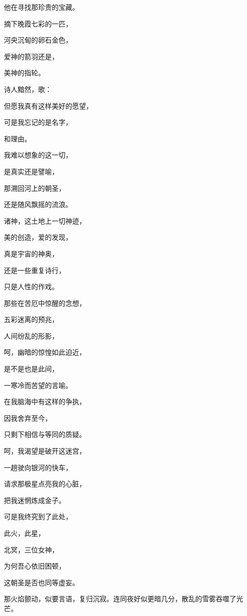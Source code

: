 \documentclass[UTF8]{article}
\begin{document}
\par 他在寻找那珍贵的宝藏。
\par 摘下晚霞七彩的一匹，
\par 河央沉甸的卵石金色，
\par 爱神的箭羽还是，
\par 美神的指轮。
\\[0.6cm]
\par 诗人黯然，歌：
\\[0.6cm]
\par 但愿我真有这样美好的愿望，
\par 可是我忘记的是名字，
\par 和理由。
\par 我难以想象的这一切，
\par 是真实还是譬喻，
\par 那溯回河上的朝圣，
\par 还是随风飘摇的流浪。
\par 诸神，这土地上一切神迹，
\par 美的创造，爱的发现，
\par 真是宇宙的神奥，
\par 还是一些重复诗行，
\par 只是人性的作戏。
\par 那些在苦厄中惊醒的念想，
\par 五彩迷离的预兆，
\par 人间纷乱的形影，
\par 呵，幽暗的惊惶如此迫近，
\par 是不是也是此间，
\par 一寒冷而苦望的言喻。
\par 在我脑海中有这样的争执，
\par 因我舍弃至今，
\par 只剩下相信与等同的质疑。
\par 呵，我渴望是破开这迷宫，
\par 一趟驶向银河的快车，
\par 请求那极星点亮我的心脏，
\par 把我迷惘炼成金子。
\par 可是我终究到了此处，
\par 此火，此星，
\par 北冥，三位女神，
\par 为何吾心依旧困顿，
\par 这朝圣是否也同等虚妄。
\\[0.6cm]
\par 那火焰颤动，似要言语，复归沉寂。连同夜好似更暗几分，散乱的雪雾吞噬了光芒。
\end{document}
